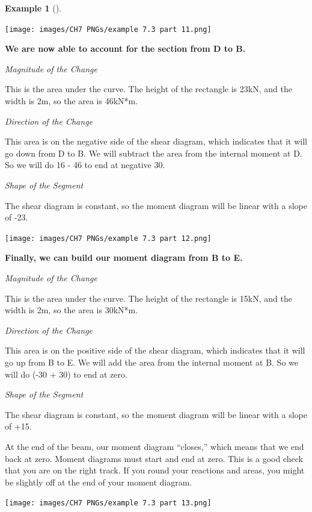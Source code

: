 \documentclass[
  letterpaper,
  DIV=11,
  numbers=noendperiod]{scrreprt}
\theoremstyle{definition}
\newtheorem{example}{Example}[chapter]
\theoremstyle{remark}
\begin{document}
\begin{tcolorbox}
\begin{example}[]
\begin{tcolorbox}
\begin{center}
\texttt{[image: images/CH7 PNGs/example 7.3 part 11.png]}
\end{center}

\textbf{We are now able to account for the section from D to B.}

\emph{Magnitude of the Change}

This is the area under the curve. The height of the rectangle is 23kN,
and the width is 2m, so the area is 46kN*m.

\emph{Direction of the Change}

This area is on the negative side of the shear diagram, which indicates
that it will go down from D to B. We will subtract the area from the
internal moment at D. So we will do 16 - 46 to end at negative 30.

\emph{Shape of the Segment}

The shear diagram is constant, so the moment diagram will be linear with
a slope of -23.

\begin{center}
\texttt{[image: images/CH7 PNGs/example 7.3 part 12.png]}
\end{center}

\textbf{Finally, we can build our moment diagram from B to E.}

\emph{Magnitude of the Change}

This is the area under the curve. The height of the rectangle is 15kN,
and the width is 2m, so the area is 30kN*m.

\emph{Direction of the Change}

This area is on the positive side of the shear diagram, which indicates
that it will go up from B to E. We will add the area from the internal
moment at B. So we will do (-30 + 30) to end at zero.

\emph{Shape of the Segment}

The shear diagram is constant, so the moment diagram will be linear with
a slope of +15.

At the end of the beam, our moment diagram ``closes,'' which means that
we end back at zero. Moment diagrams must start and end at zero. This is
a good check that you are on the right track. If you round your
reactions and areas, you might be slightly off at the end of your moment
diagram.

\begin{center}
\texttt{[image: images/CH7 PNGs/example 7.3 part 13.png]}
\end{center}


\end{tcolorbox}
\end{example}
\end{tcolorbox}
\end{document}
